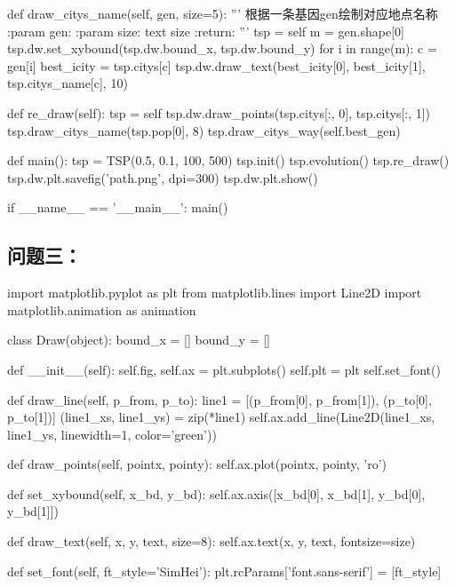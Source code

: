 \documentclass{ctexart}
\begin{document}
\begin{python}
    def draw_citys_name(self, gen, size=5):
        '''
        根据一条基因gen绘制对应地点名称
        :param gen:
        :param size: text size
        :return:
        '''
        tsp = self
        m = gen.shape[0]
        tsp.dw.set_xybound(tsp.dw.bound_x, tsp.dw.bound_y)
        for i in range(m):
            c = gen[i]
            best_icity = tsp.citys[c]
            tsp.dw.draw_text(best_icity[0], best_icity[1], tsp.citys_name[c], 10)

    def re_draw(self):
        tsp = self
        tsp.dw.draw_points(tsp.citys[:, 0], tsp.citys[:, 1])
        tsp.draw_citys_name(tsp.pop[0], 8)
        tsp.draw_citys_way(self.best_gen)


def main():
    tsp = TSP(0.5, 0.1, 100, 500)
    tsp.init()
    tsp.evolution()
    tsp.re_draw()
    tsp.dw.plt.savefig('path.png', dpi=300)
    tsp.dw.plt.show()


if __name__ == '__main__':
    main()

    \end{python}

\subsection*{问题三：}
\begin{python}
import matplotlib.pyplot as plt
from matplotlib.lines import Line2D
import matplotlib.animation as animation

class Draw(object):
    bound_x = []
    bound_y = []

    def __init__(self):
        self.fig, self.ax = plt.subplots()
        self.plt = plt
        self.set_font()

    def draw_line(self, p_from, p_to):
        line1 = [(p_from[0], p_from[1]), (p_to[0], p_to[1])]
        (line1_xs, line1_ys) = zip(*line1)
        self.ax.add_line(Line2D(line1_xs, line1_ys, linewidth=1, color='green'))

    def draw_points(self, pointx, pointy):
        self.ax.plot(pointx, pointy, 'ro')

    def set_xybound(self, x_bd, y_bd):
        self.ax.axis([x_bd[0], x_bd[1], y_bd[0], y_bd[1]])

    def draw_text(self, x, y, text, size=8):
        self.ax.text(x, y, text, fontsize=size)

    def set_font(self, ft_style='SimHei'):
        plt.rcParams['font.sans-serif'] = [ft_style]
\end{python}
\end{document}
